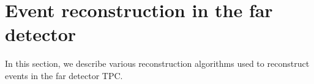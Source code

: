 \section{Event reconstruction in the far detector}
\label{sec:tools-fdreco}

In this section, we describe various reconstruction algorithms used to reconstruct events in the far detector TPC. %


